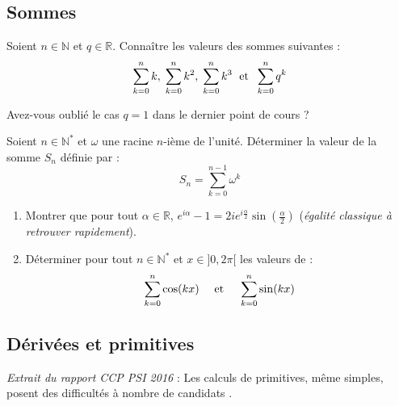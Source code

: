 \documentclass[a4paper,twoside,french,10pt]{VcCours}
\begin{document}
\medskip

\subsection{Sommes}

\medskip

\begin{ptc}
Soient $n \in \mathbb{N}$ et $q \in \mathbb{R}$. Connaître les valeurs des sommes suivantes :
$$ \sum_{k=0}^n k, \;  \sum_{k=0}^n k^2, \; \sum_{k=0}^n k^3  \; \hbox{ et } \; \sum_{k=0}^n q^k$$
\end{ptc}

\medskip

\begin{Exercice}{}\end{Exercice} Avez-vous oublié le cas $q=1$ dans le dernier point de cours ?

\medskip

\begin{Exercice}{}\end{Exercice} Soient $n \in \mathbb{N}^*$ et $\omega $ une racine $n$-ième de l'unité. Déterminer la valeur de la somme $S_n$ définie par :$$ S_n= \sum_{k=0}^{n-1} \omega^k$$

\medskip


\begin{Exercice}{}\end{Exercice} 

\begin{enumerate}
\item Montrer que pour tout $\alpha \in \mathbb{R}$, $e^{i \alpha}-1 = 2ie^{i \frac{\alpha}{2}}\sin \left(\frac{\alpha}{2}\right)$ (\textit{égalité classique à retrouver rapidement}).
\item Déterminer pour tout $n \in \mathbb{N}^*$ et $x \in ]0, 2\pi [$ les valeurs de :
$$ \sum_{k=0}^n \cos(kx) \quad \hbox{ et }  \quad\sum_{k=0}^n \sin(kx) $$
\end{enumerate}

\medskip


\subsection{Dérivées et primitives}

\medskip

\textit{Extrait du rapport CCP PSI 2016} : \og Les calculs de primitives, même simples, posent des difficultés à nombre de candidats \fg{} .

\medskip
\end{document}
